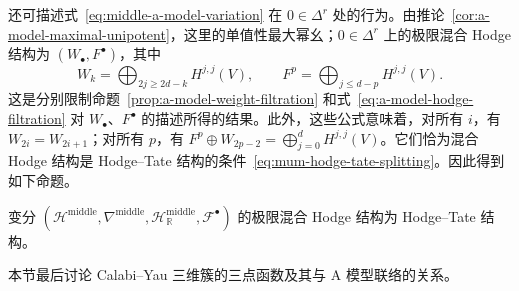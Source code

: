 还可描述式~\eqref{eq:middle-a-model-variation} 在 $0\in\Delta^r$ 处的行为。由推论~\ref{cor:a-model-maximal-unipotent}，这里的单值性最大幂幺；$0\in\Delta^r$ 上的极限混合 Hodge 结构为 $(W_\bullet,F^\bullet)$，其中
\[
W_k=\bigoplus_{2j\ge2d-k}H^{j,j}(V),\qquad
F^p=\bigoplus_{j\le d-p}H^{j,j}(V).
\]
这是分别限制命题~\ref{prop:a-model-weight-filtration} 和式~\eqref{eq:a-model-hodge-filtration} 对 $W_\bullet$、$F^\bullet$ 的描述所得的结果。此外，这些公式意味着，对所有 $i$，有 $W_{2i}=W_{2i+1}$；对所有 $p$，有 $F^p\oplus W_{2p-2}=\bigoplus_{j=0}^dH^{j,j}(V)$。它们恰为混合 Hodge 结构是 Hodge--Tate 结构的条件~\eqref{eq:mum-hodge-tate-splitting}。因此得到如下命题。
\begin{proposition}\label{prop:a-model-hodge-tate}
变分 $(\mathcal H^{\mathrm{middle}},\nabla^{\mathrm{middle}},\mathcal H^{\mathrm{middle}}_{\mathbb R},\mathcal F^\bullet)$ 的极限混合 Hodge 结构为 Hodge--Tate 结构。
\end{proposition}
本节最后讨论 Calabi--Yau 三维簇的三点函数及其与 A 模型联络的关系。

